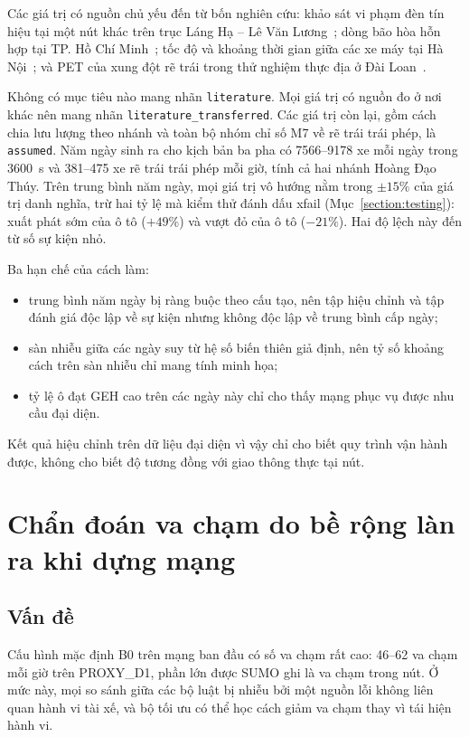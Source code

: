 \documentclass[../DoAn.tex]{subfiles}
\begin{document}
Các giá trị có nguồn chủ yếu đến từ bốn nghiên cứu: khảo sát vi phạm đèn tín hiệu tại một nút khác trên trục Láng Hạ -- Lê Văn Lương~\cite{mai2019signal}; dòng bão hòa hỗn hợp tại TP. Hồ Chí Minh~\cite{vu2015saturation}; tốc độ và khoảng thời gian giữa các xe máy tại Hà Nội~\cite{chu2005speed}; và PET của xung đột rẽ trái trong thử nghiệm thực địa ở Đài Loan~\cite{hsu2024v2x}.

Không có mục tiêu nào mang nhãn \texttt{literature}. Mọi giá trị có nguồn đo ở nơi khác nên mang nhãn \texttt{literature\_transferred}. Các giá trị còn lại, gồm cách chia lưu lượng theo nhánh và toàn bộ nhóm chỉ số M7 về rẽ trái trái phép, là \texttt{assumed}. Năm ngày sinh ra cho kịch bản ba pha có 7566--9178 xe mỗi ngày trong 3600~s và 381--475 xe rẽ trái trái phép mỗi giờ, tính cả hai nhánh Hoàng Đạo Thúy. Trên trung bình năm ngày, mọi giá trị vô hướng nằm trong $\pm 15\%$ của giá trị danh nghĩa, trừ hai tỷ lệ mà kiểm thử đánh dấu xfail (Mục~\ref{section:testing}): xuất phát sớm của ô tô ($+49\%$) và vượt đỏ của ô tô ($-21\%$). Hai độ lệch này đến từ số sự kiện nhỏ.

Ba hạn chế của cách làm:
\begin{itemize}
    \item trung bình năm ngày bị ràng buộc theo cấu tạo, nên tập hiệu chỉnh và tập đánh giá độc lập về sự kiện nhưng không độc lập về trung bình cấp ngày;
    \item sàn nhiễu giữa các ngày suy từ hệ số biến thiên giả định, nên tỷ số khoảng cách trên sàn nhiễu chỉ mang tính minh họa;
    \item tỷ lệ ô đạt GEH cao trên các ngày này chỉ cho thấy mạng phục vụ được nhu cầu đại diện.
\end{itemize}
Kết quả hiệu chỉnh trên dữ liệu đại diện vì vậy chỉ cho biết quy trình vận hành được, không cho biết độ tương đồng với giao thông thực tại nút.

\section{Chẩn đoán va chạm do bề rộng làn ra khi dựng mạng}
\label{section:5.5}

\subsection{Vấn đề}

Cấu hình mặc định B0 trên mạng ban đầu có số va chạm rất cao: 46--62 va chạm mỗi giờ trên PROXY\_D1, phần lớn được SUMO ghi là va chạm trong nút. Ở mức này, mọi so sánh giữa các bộ luật bị nhiễu bởi một nguồn lỗi không liên quan hành vi tài xế, và bộ tối ưu có thể học cách giảm va chạm thay vì tái hiện hành vi.
\end{document}

